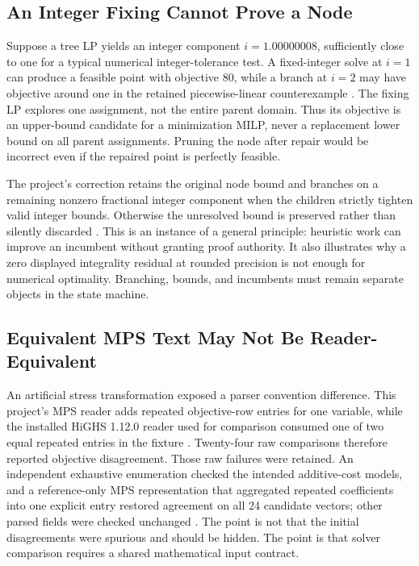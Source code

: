 \documentclass[10pt,a4paper,twocolumn]{article}
\begin{document}
\subsection{An Integer Fixing Cannot Prove a Node}

Suppose a tree LP yields an integer component $i=1.00000008$, sufficiently close to one for a typical numerical integer-tolerance test. A fixed-integer solve at $i=1$ can produce a feasible point with objective 80, while a branch at $i=2$ may have objective around one in the retained piecewise-linear counterexample \cite{repairmethod}. The fixing LP explores one assignment, not the entire parent domain. Thus its objective is an upper-bound candidate for a minimization MILP, never a replacement lower bound on all parent assignments. Pruning the node after repair would be incorrect even if the repaired point is perfectly feasible.

The project's correction retains the original node bound and branches on a remaining nonzero fractional integer component when the children strictly tighten valid integer bounds. Otherwise the unresolved bound is preserved rather than silently discarded \cite{repairmethod}. This is an instance of a general principle: heuristic work can improve an incumbent without granting proof authority. It also illustrates why a zero displayed integrality residual at rounded precision is not enough for numerical optimality. Branching, bounds, and incumbents must remain separate objects in the state machine.

\subsection{Equivalent MPS Text May Not Be Reader-Equivalent}

An artificial stress transformation exposed a parser convention difference. This project's MPS reader adds repeated objective-row entries for one variable, while the installed HiGHS 1.12.0 reader used for comparison consumed one of two equal repeated entries in the fixture \cite{mpsduplicates}. Twenty-four raw comparisons therefore reported objective disagreement. Those raw failures were retained. An independent exhaustive enumeration checked the intended additive-cost models, and a reference-only MPS representation that aggregated repeated coefficients into one explicit entry restored agreement on all 24 candidate vectors; other parsed fields were checked unchanged \cite{mpsduplicates}. The point is not that the initial disagreements were spurious and should be hidden. The point is that solver comparison requires a shared mathematical input contract.
\end{document}
